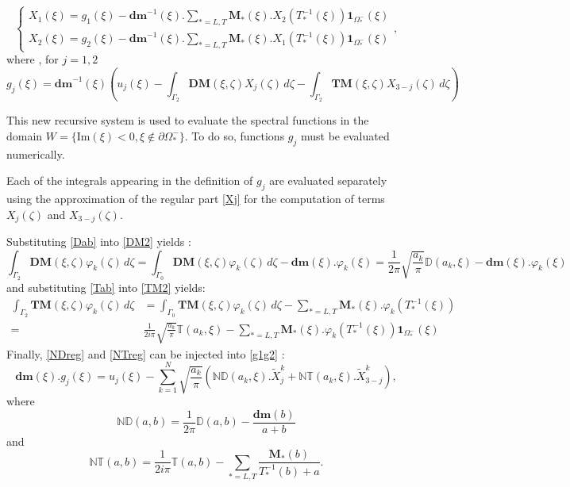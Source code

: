 \begin{equation}
\left\{
\begin{matrix}
X_1(\xi) =g_1(\xi)-\textbf{dm}^{-1}(\xi).\underset{*=L,T}{\sum} \mathbf{M}_*(\xi).X_2(T_*^{-1}(\xi))\textbf{1}_{\Omega_*^-}(\xi) \\
X_2(\xi) =g_2(\xi)-\textbf{dm}^{-1}(\xi).\underset{*=L,T}{\sum} \mathbf{M}_*(\xi).X_1(T_*^{-1}(\xi))\textbf{1}_{\Omega_*^-}(\xi)
\end{matrix}
\right.,
\label{recur}
\end{equation}
where , for $j=1,2$
\begin{equation}
g_j(\xi)=\textbf{dm}^{-1}(\xi)\left( u_j(\xi)- \int_{\Gamma_2}  \textbf{DM}(\xi,\zeta)X_j(\zeta)\, d\zeta- \int_{\Gamma_2}  \textbf{TM}(\xi,\zeta)X_{3-j}(\zeta)\, d\zeta \right) 
\label{g1g2}
\end{equation}

This new recursive system is used to evaluate the spectral functions in the domain $W=\{ \mbox{Im}(\xi)<0, \xi \notin \partial \Omega_*^- \}$. To do so, functions $g_j$ must be evaluated numerically.

Each of the integrals appearing in the definition of $g_j$ are evaluated separately using the approximation of the regular part \eqref{Xj} for the computation of terms $X_j(\zeta)$ and $X_{3-j}(\zeta)$. 

Substituting \eqref{Dab} into \eqref{DM2} yields :
\begin{equation}
\int_{\Gamma_2}\textbf{DM}(\xi,\zeta)\varphi_k(\zeta) \, d\zeta = \int_{\Gamma_0}\textbf{DM}(\xi,\zeta)\varphi_k(\zeta)\, d\zeta -\textbf{dm}(\xi).\varphi_k(\xi)=\frac{1}{2\pi}\sqrt{\frac{a_k}{\pi}} \mathbb{D}(a_k,\xi)-\textbf{dm}(\xi).\varphi_k(\xi) 
\label{NDreg}
\end{equation}
and substituting \eqref{Tab} into \eqref{TM2} yields:
\begin{equation}
\begin{split}
\int_{\Gamma_2}  \textbf{TM}(\xi,\zeta)\varphi_k(\zeta)\, d\zeta&=\int_{\Gamma_0} \textbf{TM}(\xi,\zeta)\varphi_k(\zeta)\, d\zeta  -\sum_{*=L,T} \mathbf{M}_*(\xi).\varphi_k(T^{-1}_*(\xi)) \\
= &\frac{1}{2i\pi} \sqrt{\frac{a_k}{\pi}} \mathbb{T}(a_k,\xi)- \sum_{*=L,T}\mathbf{M}_*(\xi).\varphi_k(T^{-1}_*(\xi))\textbf{1}_{\Omega_*^-}(\xi)
\end{split}
\label{NTreg}
\end{equation}
Finally, \eqref{NDreg} and \eqref{NTreg} can be injected into \eqref{g1g2} :
\begin{equation}
\textbf{dm}(\xi).g_j(\xi)=u_j(\xi)-\sum_{k=1}^N \sqrt{\frac{a_k}{\pi}}\left( \mathbb{ND}(a_k,\xi).\tilde{X}_j^k+\mathbb{NT}(a_k,\xi).\tilde{X}_{3-j}^k \right) ,
\label{gjfinal}
\end{equation}
where
\begin{equation}
\mathbb{ND}(a,b)=\frac{1}{2\pi}\mathbb{D}(a,b)-\frac{\textbf{dm}(b)}{a+b}
\label{defND}
\end{equation}
and
\begin{equation}
\mathbb{NT}(a,b)=\frac{1}{2i\pi}\mathbb{T}(a,b)-\sum_{*=L,T}\frac{\mathbf{M}_*(b)}{T^{-1}_*(b)+a} .
\end{equation}

